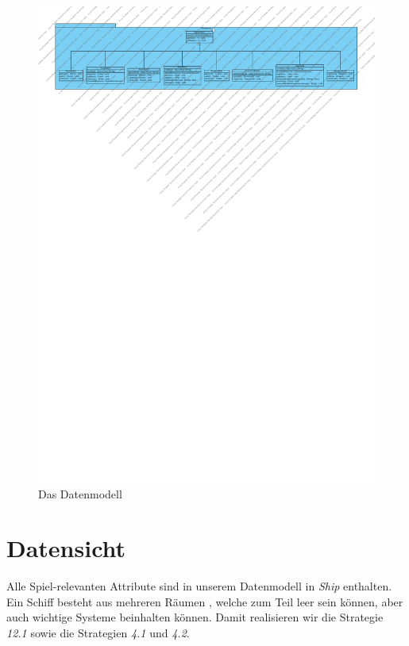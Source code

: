\documentclass[fontsize=12pt,paper=a4,twoside]{scrartcl}
\begin{document}
\begin{figure}[H]
\begin{center}
  \includegraphics[width=\linewidth]{../GT_Modulsicht/src/Persistenz.pdf}
    \caption{Das Datenmodell}
\end{center}
\end{figure}


\section{Datensicht} \label{sec:datensicht}



Alle Spiel-relevanten Attribute sind in unserem Datenmodell in \textit{Ship} enthalten. Ein Schiff besteht aus mehreren Räumen , welche zum Teil leer sein können, aber auch wichtige Systeme beinhalten können. Damit realisieren wir die Strategie \textit{12.1} sowie die Strategien \textit{4.1} und \textit{4.2}.
\end{document}
